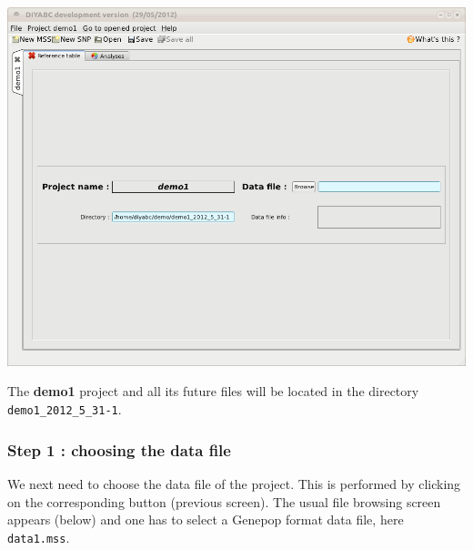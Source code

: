\includegraphics[scale=0.35]{gui_pictures/Capture-DIYABC-8.png} 

The \textbf{demo1} project and all its future files will be located in the directory \texttt{demo1\_2012\_5\_31-1}.

\subsubsection{Step 1 : choosing the data file}
We next need to choose the data file of the project. This is performed by clicking on the corresponding  button (previous screen).  The usual file browsing screen appears (below) and one has to select a Genepop format data file, here \texttt{data1.mss}. \\

